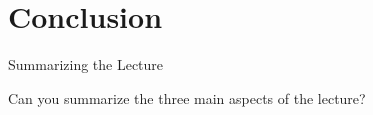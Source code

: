 \documentclass[10pt,c,aspectratio=1610,handout]{beamer}
\begin{document}
\section{Conclusion}%
\begin{frame}{Summarizing the Lecture}%
  \begin{center}%
    \begin{large}%
      Can you summarize the three main aspects of the lecture?%
    \end{large}%
  \end{center}%
\end{frame}%
\end{document}

